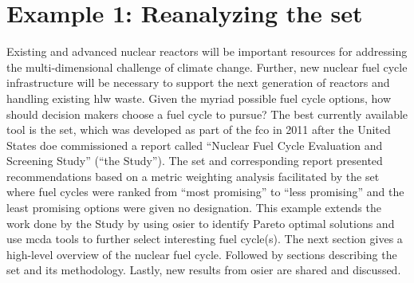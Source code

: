 
\section{Example 1: Reanalyzing the \acs{set}}

Existing and advanced nuclear reactors will be important resources for
addressing the multi-dimensional challenge of climate change. Further, new
nuclear fuel cycle infrastructure will be necessary to support the next
generation of reactors and handling existing \ac{hlw} waste. Given the myriad
possible fuel cycle options, how should decision makers choose a fuel cycle to
pursue? The best currently available tool is the \acf{set}, which was developed
as part of the \ac{fco} in 2011 after the United States \ac{doe} commissioned a
report called ``Nuclear Fuel Cycle Evaluation and Screening Study'' (``the
Study'')\cite{wigeland_nuclear_2014-2}. The \ac{set} and corresponding report
presented recommendations based on a metric weighting analysis facilitated by
the \ac{set} where fuel cycles were ranked from ``most promising'' to ``less
promising'' and the least promising options were given no designation. This
example extends the work done by the Study by using \ac{osier} to identify
Pareto optimal solutions and use \ac{mcda} tools to further select interesting
fuel cycle(s). The next section gives a high-level overview of the nuclear fuel
cycle. Followed by sections describing the \ac{set} and its methodology. Lastly,
new results from \ac{osier} are shared and discussed.



